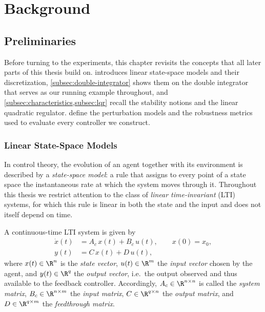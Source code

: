 \chapter{Background}
\label{chap:background}

\section{Preliminaries}
\label{sec:preliminaries}

Before turning to the experiments, this chapter revisits the concepts that all
later parts of this thesis build on.  introduces linear
state-space models and their discretization, \cref{subsec:double-integrator}
shows them on the double integrator that serves as our running example
throughout, and \cref{subsec:characteristics,subsec:lqr} recall the stability notions and
the linear quadratic regulator.  define the
perturbation models and the robustness metrics used to evaluate every
controller we construct.

\subsection{Linear State-Space Models}
\label{subsec:state-space}
 
In control theory, the evolution of an agent together with its environment is
described by a \emph{state-space model}: a rule that assigns to every point of
a state space the instantaneous rate at which the system moves through it.
Throughout this thesis we restrict attention to the class of
\emph{linear time-invariant} (LTI) systems, for which this rule is linear in
both the state and the input and does not itself depend on
time.
 
A continuous-time LTI system is given by
\begin{subequations}
\label{eq:ss-cont}
\begin{align}
    \dot{x}(t) &= A_c\, x(t) + B_c\, u(t), \qquad x(0) = x_0, \label{eq:ss-cont-state}\\
    y(t)       &= C\, x(t) + D\, u(t), \label{eq:ss-cont-output}
\end{align}
\end{subequations}
where $x(t) \in \R^{n}$ is the \emph{state vector}, $u(t) \in \R^{m}$ the
\emph{input vector} chosen by the agent, and $y(t) \in \R^{q}$ the
\emph{output vector}, i.e.\ the output observed and thus available to the
feedback controller. Accordingly, $A_c \in \R^{n \times n}$ is called the
\emph{system matrix}, $B_c \in \R^{n \times m}$ the \emph{input matrix},
$C \in \R^{q \times n}$ the \emph{output matrix}, and $D \in \R^{q \times m}$
the \emph{feedthrough matrix}.
 
